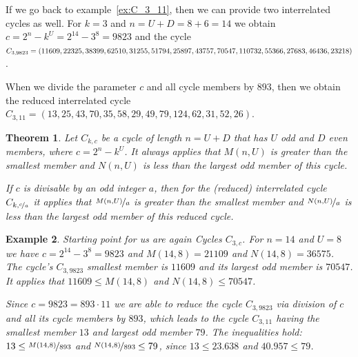 \documentclass[12pt]{amsart}
\newtheorem{theorem}{Theorem}[section]
\newtheorem{example}[theorem]{Example}
\theoremstyle{definition}
\begin{document}
If we go back to example~\ref{ex:C_3_11}, then we can provide two interrelated cycles as well. For $k=3$ and $n=U+D=8+6=14$ we obtain $c=2^n-k^U=2^{14}-3^8=9823$ and the cycle $C_{3,9823}=(11609,22325,38399,62510,31255,51794,25897,43757,70547,110732,55366,\\27683,46436,23218)$.

When we divide the parameter $c$ and all cycle members by $893$, then we obtain the reduced interrelated cycle $C_{3,11}=(13,25,43,70,35,58,29,49,79,124,62,31,52,26)$.

\begin{theorem}
\label{theo:containment_M_N}
Let $C_{k,c}$ be a cycle of length $n=U+D$ that has $U$ odd and $D$ even members, where $c=2^n-k^U$. It always applies that $M(n,U)$ is greater than the smallest member and $N(n,U)$ is less than the largest odd member of this cycle.

If $c$ is divisable by an odd integer $a$, then for the (reduced) interrelated cycle $C_{k,\nicefrac{c}{a}}$ it applies that $\nicefrac{M(n,U)}{a}$ is greater than the smallest member and $\nicefrac{N(n,U)}{a}$ is less than the largest odd member of this reduced cycle.
\end{theorem}

\begin{example}
\label{ex:interrelated_M_N}
Starting point for us are again Cycles $C_{3,c}$. For $n=14$ and $U=8$ we have $c=2^{14}-3^8=9823$ and $M(14,8)=21109$ and $N(14,8)=36575$. The cycle's $C_{3,9823}$ smallest member is $11609$ and its largest odd member is $70547$. It applies that $11609\le M(14,8)$ and $N(14,8)\le70547$.

Since $c=9823=893\cdot11$ we are able to reduce the cycle $C_{3,9823}$ via division of $c$ and all its cycle members by $893$, which leads to the cycle $C_{3,11}$ having the smallest member $13$ and largest odd member $79$. The inequalities hold: $13\le\nicefrac{M(14,8)}{893}$ and $\nicefrac{N(14,8)}{893}\le79$, since $13\le23.638$ and $40.957\le79$.
\end{example}

\vspace{1em}


\end{document}

